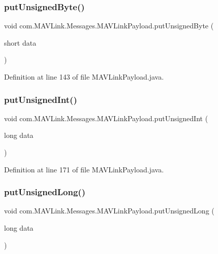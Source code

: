 \subsubsection{\texorpdfstring{putUnsignedByte()}{putUnsignedByte()}}
{\footnotesize\ttfamily void com.\+M\+A\+V\+Link.\+Messages.\+M\+A\+V\+Link\+Payload.\+put\+Unsigned\+Byte (\begin{DoxyParamCaption}\item[{short}]{data }\end{DoxyParamCaption})\hspace{0.3cm}{\ttfamily [inline]}}



Definition at line 143 of file M\+A\+V\+Link\+Payload.\+java.

\mbox{\label{classcom_1_1MAVLink_1_1Messages_1_1MAVLinkPayload_a69cb71c6076284efb1494a3d903b0844}} 
\subsubsection{\texorpdfstring{putUnsignedInt()}{putUnsignedInt()}}
{\footnotesize\ttfamily void com.\+M\+A\+V\+Link.\+Messages.\+M\+A\+V\+Link\+Payload.\+put\+Unsigned\+Int (\begin{DoxyParamCaption}\item[{long}]{data }\end{DoxyParamCaption})\hspace{0.3cm}{\ttfamily [inline]}}



Definition at line 171 of file M\+A\+V\+Link\+Payload.\+java.

\mbox{\label{classcom_1_1MAVLink_1_1Messages_1_1MAVLinkPayload_af227d362b0c7c68c26fedeecf864a568}} 
\subsubsection{\texorpdfstring{putUnsignedLong()}{putUnsignedLong()}}
{\footnotesize\ttfamily void com.\+M\+A\+V\+Link.\+Messages.\+M\+A\+V\+Link\+Payload.\+put\+Unsigned\+Long (\begin{DoxyParamCaption}\item[{long}]{data }\end{DoxyParamCaption})\hspace{0.3cm}{\ttfamily [inline]}}



